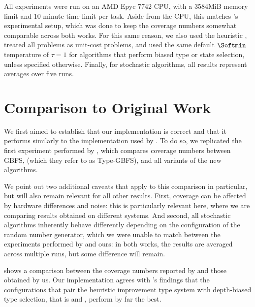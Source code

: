 All experiments were run on an AMD Epyc 7742 CPU, with a 3584MiB memory limit and 10 minute time limit per task. Aside from the CPU, this matches 's experimental setup, which was done to keep the coverage numbers somewhat comparable across both works. For this same reason, we also used the  heuristic , treated all problems as unit-cost problems, and used the same default $\Softmin$ temperature of $\tau=1$ for algorithms that perform biased type or state selection, unless specified otherwise. Finally, for stochastic algorithms, all results represent averages over five runs.


\section{Comparison to Original Work}

We first aimed to establish that our implementation is correct and that it performs similarly to the implementation used by . To do so, we replicated the first experiment performed by , which compares coverage numbers between GBFS, \hgUu (which they refer to as Type-GBFS), and all variants of the new algorithms.

We point out two additional caveats that apply to this comparison in particular, but will also remain relevant for all other results. First, coverage can be affected by hardware differences and noise: this is particularly relevant here, where we are comparing results obtained on different systems. And second, all stochastic algorithms inherently behave differently depending on the configuration of the random number generator, which we were unable to match between the experiments performed by  and ours: in both works, the results are averaged across multiple runs, but some difference will remain.

 shows a comparison between the coverage numbers reported by  and those obtained by us. Our implementation agrees with 's findings that the configurations that pair the heuristic improvement type system with depth-biased type selection, that is \hiDh and \hiDu, perform by far the best.

